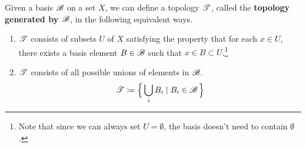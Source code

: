   \begin{definition}
    \label{def:basis-to-topology}
    Given a basis $\B$ on a set $X$, we can define a topology $\T$, called the \textbf{topology generated by $\B$}, in the following equivalent ways. 
    \begin{enumerate}
      \item $\T$ consists of subsets $U$ of $X$ satisfying the property that for each $x \in U$, there exists a basis element $B \in \B$ such that $x \in B \subset U$.\footnote{Note that since we can always set $U = \emptyset$, the basis doesn't need to contain $\emptyset$. }
      \begin{center}
      \end{center}

      \item $\T$ consists of all possible unions of elements in $\B$. 
      \begin{equation}
        \T \coloneqq \Big\{ \bigcup_i B_i \mid B_i \in \B\Big\}
      \end{equation}
    \end{enumerate}
  \end{definition} 
